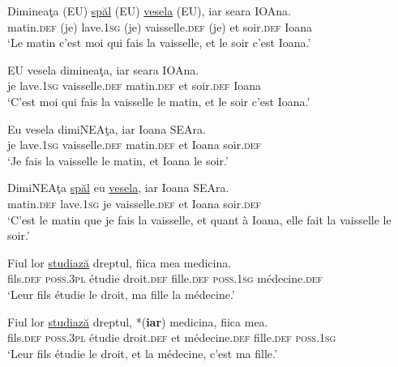\ea \label{ch2:ex139}
\ea 
\gll Dimineaţa  (EU)  \uline{spăl}  (EU)  \uline{vesela}  (EU),  iar  seara  IOAna.\\
matin.\textsc{def}  (je)  lave.\textsc{1sg}  (je)  vaisselle.\textsc{def}  (je)  et soir.\textsc{def}  Ioana\\ 
\glt ‘Le matin c’est moi qui fais la vaisselle, et le soir c’est Ioana.’  

\ex 
\gll EU    vesela  dimineaţa,  iar  seara  IOAna.\\
je  lave.\textsc{1sg}  vaisselle.\textsc{def}  matin.\textsc{def}  et  soir.\textsc{def} Ioana\\
\glt ‘C’est moi qui fais la vaisselle le matin, et le soir c’est Ioana.’

\ex  
\gll Eu    vesela  dimiNEAţa,  iar  Ioana  SEAra.\\
je  lave.\textsc{1sg}  vaisselle.\textsc{def}  matin.\textsc{def}  et  Ioana  soir.\textsc{def}\\
\glt ‘Je fais la vaisselle le matin, et Ioana le soir.’ 

\ex 
\gll DimiNEAţa  \uline{spăl}  eu  \uline{vesela},  iar  Ioana  SEAra.\\
matin.\textsc{def}  lave.\textsc{1sg}  je  vaisselle.\textsc{def}  et  Ioana  soir.\textsc{def}\\
\glt ‘C’est le matin que je fais la vaisselle, et quant à Ioana, elle fait la vaisselle le soir.’ 
\z
\z

\ea \label{ch2:ex140}
\ea 
\gll Fiul  lor  \uline{studiază}  dreptul,  fiica  mea  medicina. \label{ch2:ex140a}\\
fils.\textsc{def} \textsc{poss.3pl} étudie  droit.\textsc{def}  fille.\textsc{def}  \textsc{poss.1sg}  médecine.\textsc{def}\\ 
\glt ‘Leur fils étudie le droit, ma fille la médecine.’  

\ex  
\gll Fiul  lor  \uline{studiază}  dreptul,  *(\textbf{iar})  medicina,  fiica  mea. \label{ch2:ex140b}\\
fils.\textsc{def} \textsc{poss.3pl} étudie  droit\textsc{.def}  et  médecine\textsc{.def}  fille.\textsc{def} \textsc{poss.1sg}\\
\glt ‘Leur fils étudie le droit, et la médecine, c’est ma fille.’ 
\z
\z

